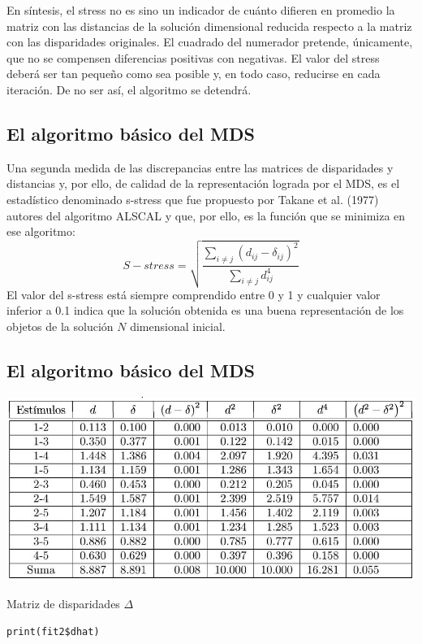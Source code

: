 \documentclass[]{article}
\begin{document}
\hypertarget{right}{}
En síntesis, el {stress} no es sino un {indicador} de {cuánto difieren
en promedio} la {matriz con las distancias de la solución dimensional
reducida} respecto a la {matriz con las disparidades originales}. El
cuadrado del numerador pretende, únicamente, que no se compensen
diferencias positivas con negativas. El valor del {stress} deberá ser
{tan pequeño como sea posible} y, en todo caso, reducirse en cada
iteración. De no ser así, el algoritmo se detendrá.

\subsection{El algoritmo básico del
MDS}\label{el-algoritmo-buxe1sico-del-mds-7}

Una {segunda medida} de las {discrepancias entre las matrices de
disparidades y distancias} y, por ello, de calidad de la representación
lograda por el MDS, es el estadístico denominado s-stress que fue
propuesto por Takane et al. (1977) autores del algoritmo ALSCAL y que,
por ello, es la función que se minimiza en ese algoritmo:
\[S-stress=\sqrt{\frac{\sum_{i \neq j} (d_{ij}-\delta_{ij})^2}{\sum_{i \neq j} d^4_{ij}}}\]
El valor del {s-stress} está siempre {comprendido entre 0 y 1} y
cualquier {valor inferior a 0.1} indica que la {solución obtenida} es
una {buena representación} de los objetos de la solución \(N\)
dimensional inicial.

\subsection{El algoritmo básico del
MDS}\label{el-algoritmo-buxe1sico-del-mds-8}

\hypertarget{left}{}
\includegraphics[width=1\linewidth]{images/estimulos}

\hypertarget{right}{}
 Matriz de disparidades \(\Delta\)

\begin{verbatim}
print(fit2$dhat)
\end{verbatim}
\end{document}
